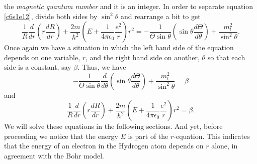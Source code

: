 the \emph{magnetic quantum number} and it is an integer. In order to separate 
equation \eqref{c6s1e12}, divide both sides by $\sin^2\theta$ and rearrange a 
bit to get
\begin{equation}\label{c6s1e14}
\frac{1}{R}\frac{d}{dr}\left(r\frac{dR}{dr}\right) +
\frac{2m}{\hslash^2}\left(E + \frac{1}{4\pi\epsilon_0}\frac{e^2}{r}\right)r^2 =
-\frac{1}{\Theta\sin\theta}\left(\sin\theta\frac{d\Theta}{d\theta}\right) +
\frac{m_l^2}{\sin^2\theta}.
\end{equation}
Once again we have a situation in which the left hand side of the equation 
depends on one variable, $r$, and the right hand side on another, $\theta$
so that each side is a constant, say $\beta$. Thus, we have
\begin{equation}\label{c6s1e16}
-\frac{1}{\Theta\sin\theta}\frac{d}{d\theta}
\left(\sin\theta\frac{d\Theta}{d\theta}\right) +\frac{m_l^2}{\sin^2\theta} = 
\beta
\end{equation}
and
\begin{equation}\label{c6s1e17}
\frac{1}{R}\frac{d}{dr}\left(r\frac{dR}{dr}\right) +
\frac{2m}{\hslash^2}\left(E + \frac{1}{4\pi\epsilon_0}\frac{e^2}{r}\right)r^2 =
\beta.
\end{equation}
We will solve these equations in the following sections. And yet, before 
proceeding we notice that the energy $E$ is part of the $r$-equation. This 
indicates that the energy of an electron in the Hydrogen atom depends on $r$
alone, in agreement with the Bohr model.

